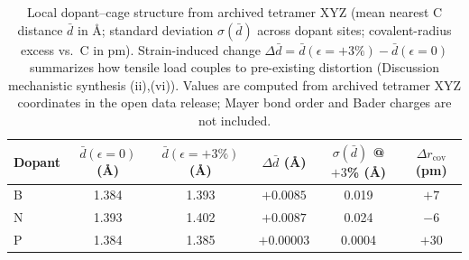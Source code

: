 \begin{table}[t]
\caption{\label{tab:S5}Local dopant--cage structure from archived tetramer XYZ (mean nearest C distance $\bar{d}$ in \AA; standard deviation $\sigma(\bar{d})$ across dopant sites; covalent-radius excess vs.\ C in pm).
Strain-induced change $\Delta\bar{d}=\bar{d}(\epsilon{=}+3\%)-\bar{d}(\epsilon{=}0)$ summarizes how tensile load couples to pre-existing distortion (Discussion mechanistic synthesis (ii),(vi)).
Values are computed from archived tetramer XYZ coordinates in the open data release; Mayer bond order and Bader charges are not included.}
\begin{ruledtabular}
\begin{tabular}{lccccc}
Dopant & $\bar{d}(\epsilon{=}0)$ (\AA) & $\bar{d}(\epsilon{=}+3\%)$ (\AA) & $\Delta\bar{d}$ (\AA) & $\sigma(\bar{d})$ @ $+3$\% (\AA) & $\Delta r_{\mathrm{cov}}$ (pm) \\
\hline
B & 1.384 & 1.393 & $+0.0085$ & 0.019 & $+7$ \\
N & 1.393 & 1.402 & $+0.0087$ & 0.024 & $-6$ \\
P & 1.384 & 1.385 & $+0.00003$ & 0.0004 & $+30$ \\
\end{tabular}
\end{ruledtabular}
\end{table}
